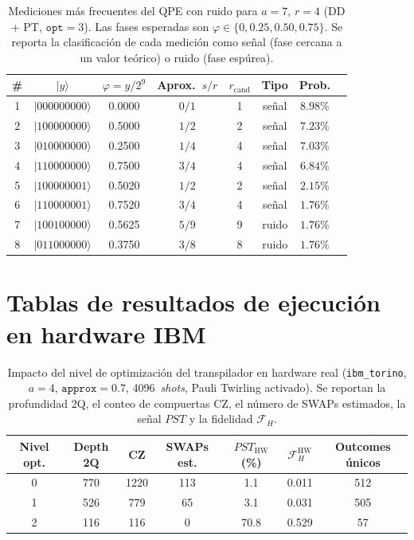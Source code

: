 \documentclass[12pt, spanish]{book}
\begin{document}
\begin{table}[H]
    \centering
    \caption{Mediciones más frecuentes del QPE con ruido para $a = 7$, $r = 4$
    (DD + PT, $\texttt{opt} = 3$). Las fases esperadas son
    $\varphi \in \{0, 0.25, 0.50, 0.75\}$. Se reporta la clasificación de cada
    medición como señal (fase cercana a un valor teórico) o ruido (fase espúrea).}
    \label{tab:qpe_ruido_a7_ddpt}
    \begin{tabular}{cccccccc}
        \hline
        \# & $|y\rangle$ & $\varphi = y/2^{9}$ & Aprox.\ $s/r$ & $r_{\text{cand}}$ & Tipo & Prob. \\
        \hline
        1 & $|000000000\rangle$ & 0.0000 & $0/1$ & 1 & señal & $8.98\%$ \\
        2 & $|100000000\rangle$ & 0.5000 & $1/2$ & 2 & señal & $7.23\%$ \\
        3 & $|010000000\rangle$ & 0.2500 & $1/4$ & 4 & señal & $7.03\%$ \\
        4 & $|110000000\rangle$ & 0.7500 & $3/4$ & 4 & señal & $6.84\%$ \\
        5 & $|100000001\rangle$ & 0.5020 & $1/2$ & 2 & señal & $2.15\%$ \\
        6 & $|110000001\rangle$ & 0.7520 & $3/4$ & 4 & señal & $1.76\%$ \\
        7 & $|100100000\rangle$ & 0.5625 & $5/9$ & 9 & ruido & $1.76\%$ \\
        8 & $|011000000\rangle$ & 0.3750 & $3/8$ & 8 & ruido & $1.76\%$ \\
        \hline
    \end{tabular}
\end{table}

\section{Tablas de resultados de ejecución en hardware IBM}

\begin{table}[H]
    \centering
    \caption{Impacto del nivel de optimización del transpilador en hardware real
    (\texttt{ibm\_torino}, $a = 4$, $\texttt{approx} = 0.7$, 4096~\textit{shots},
    Pauli Twirling activado). Se reportan la profundidad 2Q, el conteo de compuertas
    CZ, el número de SWAPs estimados, la señal $PST$ y la fidelidad $\mathcal{F}_H$.}
    \label{tab:opt_level_hardware}
    \begin{tabular}{ccccccc}
        \hline
        Nivel opt. & Depth 2Q & CZ   & SWAPs est. & $PST_{\text{HW}}$ (\%) & $\mathcal{F}_H^{\text{HW}}$ & Outcomes únicos \\
        \hline
        0 & 770 & 1220 & 113 &  1.1 & 0.011 & 512 \\
        1 & 526 &  779 &  65 &  3.1 & 0.031 & 505 \\
        2 & 116 &  116 &   0 & 70.8 & 0.529 &  57 \\
        \hline
    \end{tabular}
\end{table}
\end{document}
